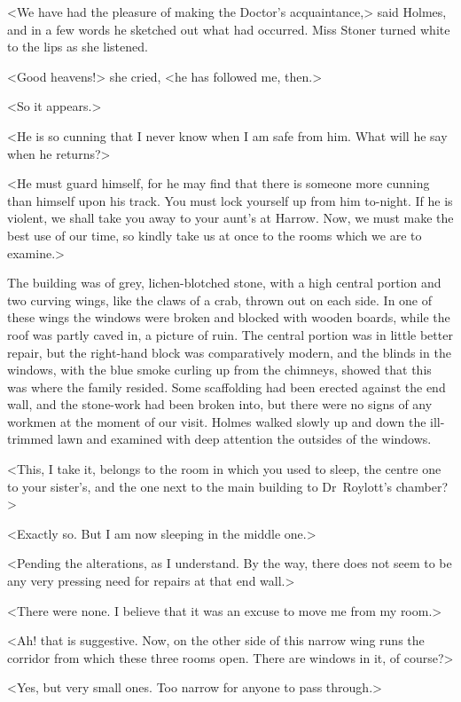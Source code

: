 <We have had the pleasure of making the Doctor's acquaintance,> said Holmes, and in a few words he sketched out what had occurred. Miss Stoner turned white to the lips as she listened.

<Good heavens!> she cried, <he has followed me, then.>

<So it appears.>

<He is so cunning that I never know when I am safe from him. What will he say when he returns?>

<He must guard himself, for he may find that there is someone more cunning than himself upon his track. You must lock yourself up from him to-night. If he is violent, we shall take you away to your aunt's at Harrow. Now, we must make the best use of our time, so kindly take us at once to the rooms which we are to examine.>

The building was of grey, lichen-blotched stone, with a high central portion and two curving wings, like the claws of a crab, thrown out on each side. In one of these wings the windows were broken and blocked with wooden boards, while the roof was partly caved in, a picture of ruin. The central portion was in little better repair, but the right-hand block was comparatively modern, and the blinds in the windows, with the blue smoke curling up from the chimneys, showed that this was where the family resided. Some scaffolding had been erected against the end wall, and the stone-work had been broken into, but there were no signs of any workmen at the moment of our visit. Holmes walked slowly up and down the ill-trimmed lawn and examined with deep attention the outsides of the windows.

<This, I take it, belongs to the room in which you used to sleep, the centre one to your sister's, and the one next to the main building to Dr~Roylott's chamber?>

<Exactly so. But I am now sleeping in the middle one.>

<Pending the alterations, as I understand. By the way, there does not seem to be any very pressing need for repairs at that end wall.>

<There were none. I believe that it was an excuse to move me from my room.>

<Ah! that is suggestive. Now, on the other side of this narrow wing runs the corridor from which these three rooms open. There are windows in it, of course?>

<Yes, but very small ones. Too narrow for anyone to pass through.>

